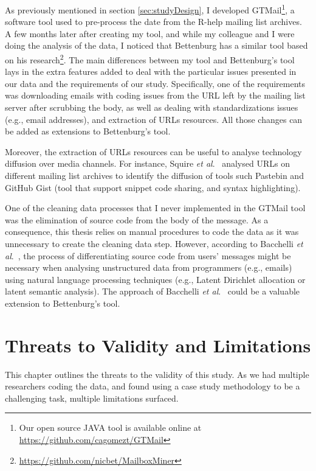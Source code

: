 \documentclass{sig-alternate-05-2015}
\begin{document}
	As previously mentioned in section \ref{sec:studyDesign}, I developed GTMail\footnote{Our open source JAVA tool is available online at \url{https://github.com/cagomezt/GTMail}}, a software tool used to pre-process the date from the R-help mailing list archives. 
	A few months later after creating my tool, and while my colleague and I were doing the analysis of the data, I noticed that Bettenburg has a similar tool based on his research\footnote{\url{https://github.com/nicbet/MailboxMiner}}.
	The main differences between my tool and Bettenburg's tool lays in the extra features added to deal with the particular issues presented in our data and the requirements of our study.
	Specifically, one of the requirements was downloading emails with coding issues from the URL left by the mailing list server after scrubbing the body, as well as dealing with standardizations issues (e.g., email addresses), and extraction of URLs resources. 
	All those changes can be added as extensions to Bettenburg's tool.

	Moreover, the extraction of URLs resources can be useful to analyse technology diffusion over media channels. 
	For instance, Squire \textit{et al}.~\cite{Squire2015} analysed URLs on different mailing list archives to identify the diffusion of tools such Pastebin and GitHub Gist (tool that support snippet code sharing, and syntax highlighting).

	One of the cleaning data processes that I never implemented in the GTMail tool was the elimination of source code from the body of the message. 
	As a consequence, this thesis relies on manual procedures to code the data as it was unnecessary to create the cleaning data step.
	However, according to Bacchelli \textit{et al}.~\cite{Bacchelli2012a}, the process of differentiating source code from users' messages might be necessary when analysing unstructured data from programmers (e.g., emails) using natural language processing techniques (e.g., Latent Dirichlet allocation or latent semantic analysis). 
	The approach of Bacchelli \textit{et al}.~\cite{Bacchelli2012a} could be a valuable extension to Bettenburg's tool.


\section{Threats to Validity and Limitations}
\label{cha:threats}

    This chapter outlines the threats to the validity of this study. As we had multiple researchers coding the data, and found using a case study methodology to be a challenging task, multiple limitations surfaced.
\end{document}
